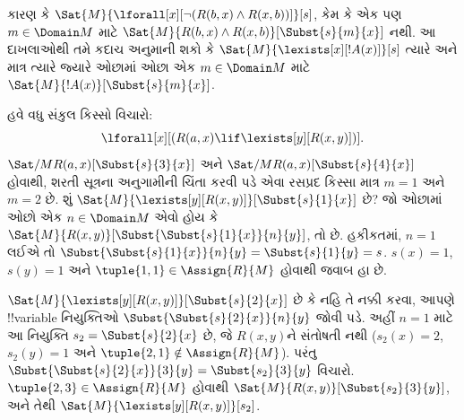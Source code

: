 \documentclass[../../../include/open-logic-section]{subfiles}
\begin{document}
\begin{ex}
{  કારણ કે $\Sat{M}{\lforall[x][\lnot(R(b,x) \land R(x,b))]}[s]$,
  કેમ કે એક પણ $m \in \Domain M$ માટે
  $\Sat{M}{R(b,x) \land R(x,b)}[\Subst{s}{m}{x}]$ નથી. આ દાખલાઓથી
  તમે કદાચ અનુમાની શકો કે $\Sat{M}{\lexists[x][!A(x)]}[s]$ ત્યારે અને
  માત્ર ત્યારે જ્યારે ઓછામાં ઓછા એક $m \in \Domain M$ માટે
  $\Sat{M}{!A(x)}[\Subst{s}{m}{x}]$.}{}


હવે વધુ સંકુલ કિસ્સો વિચારો:
\[
\lforall[x][(R(a,x) \lif \lexists[y][R(x,y)])].
\]
$\Sat/{M}{R(a,x)}[\Subst{s}{3}{x}]$ અને
$\Sat/{M}{R(a,x)}[\Subst{s}{4}{x}]$ હોવાથી, શરતી સૂત્રના અનુગામીની
ચિંતા કરવી પડે એવા રસપ્રદ કિસ્સા માત્ર $m=1$ અને $m=2$ છે. શું
$\Sat{M}{\lexists[y][R(x,y)]}[\Subst{s}{1}{x}]$ છે? જો ઓછામાં ઓછો એક
$n \in \Domain M$ એવો હોય કે
$\Sat{M}{R(x,y)}[\Subst{\Subst{s}{1}{x}}{n}{y}]$, તો છે. હકીકતમાં,
$n=1$ લઈએ તો $\Subst{\Subst{s}{1}{x}}{n}{y}=\Subst{s}{1}{y}=s$.
$s(x)=1$, $s(y)=1$ અને $\tuple{1,1}\in\Assign{R}{M}$ હોવાથી જવાબ હા
છે.

$\Sat{M}{\lexists[y][R(x,y)]}[\Subst{s}{2}{x}]$ છે કે નહિ તે નક્કી
કરવા, આપણે !!{variable} નિયુક્તિઓ
$\Subst{\Subst{s}{2}{x}}{n}{y}$ જોવી પડે. અહીં $n=1$ માટે આ નિયુક્તિ
$s_2=\Subst{s}{2}{x}$ છે, જે $R(x,y)$ને સંતોષતી નથી ($s_2(x)=2$,
$s_2(y)=1$ અને $\tuple{2,1}\notin\Assign{R}{M}$). પરંતુ
$\Subst{\Subst{s}{2}{x}}{3}{y}=\Subst{s_2}{3}{y}$ વિચારો.
$\tuple{2,3}\in\Assign{R}{M}$ હોવાથી
$\Sat{M}{R(x,y)}[\Subst{s_2}{3}{y}]$, અને તેથી
$\Sat{M}{\lexists[y][R(x,y)]}[s_2]$.


\end{ex}
\end{document}
